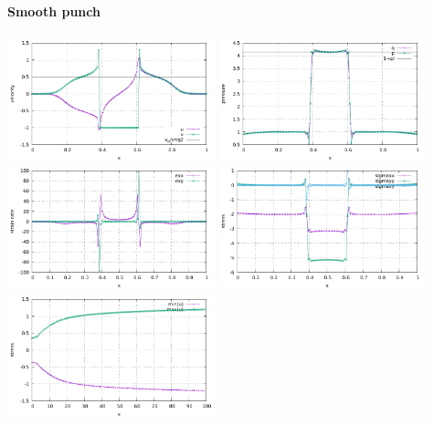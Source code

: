 \paragraph{Smooth punch}

\begin{center}
\includegraphics[width=6cm]{python_codes/fieldstone_08/results/smooth/velocity.pdf}
\includegraphics[width=6cm]{python_codes/fieldstone_08/results/smooth/pressure.pdf}\\
\includegraphics[width=6cm]{python_codes/fieldstone_08/results/smooth/strainrate.pdf}
\includegraphics[width=6cm]{python_codes/fieldstone_08/results/smooth/stress.pdf}\\
\includegraphics[width=6cm]{python_codes/fieldstone_08/results/smooth/u_stats.pdf}

\end{center}
